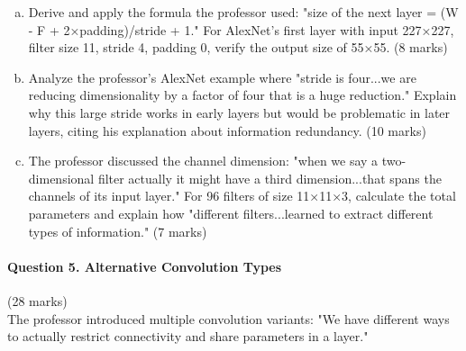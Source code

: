 \documentclass[12pt]{article}
\newcommand{\mediumanswer}{\vspace{3cm}}
\begin{document}
\begin{enumerate}[(a)]
    \item Derive and apply the formula the professor used: "size of the next layer = (W - F + 2×padding)/stride + 1." For AlexNet's first layer with input 227×227, filter size 11, stride 4, padding 0, verify the output size of 55×55. \hfill (8 marks)
    
    \mediumanswer
    
    \item Analyze the professor's AlexNet example where "stride is four...we are reducing dimensionality by a factor of four that is a huge reduction." Explain why this large stride works in early layers but would be problematic in later layers, citing his explanation about information redundancy. \hfill (10 marks)
    
    \mediumanswer
    
    \item The professor discussed the channel dimension: "when we say a two-dimensional filter actually it might have a third dimension...that spans the channels of its input layer." For 96 filters of size 11×11×3, calculate the total parameters and explain how "different filters...learned to extract different types of information." \hfill (7 marks)
    
    \mediumanswer
\end{enumerate}

\newpage
\paragraph{Question 5. Alternative Convolution Types}{\hfill (28 marks)}\\
The professor introduced multiple convolution variants: "We have different ways to actually restrict connectivity and share parameters in a layer."
\end{document}

